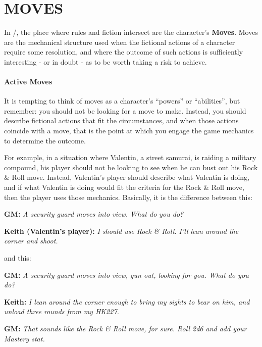 \documentclass[oneside,10pt]{article}
\begin{document}
\section{MOVES}
\label{moves}
\begin{multicols}{2}

In \SW/, the place where rules and fiction intersect are the
character’s \textbf{Moves}. Moves are the mechanical structure used
when the fictional actions of a character require some resolution,
and where the outcome of such actions is sufficiently interesting -
or in doubt - as to be worth taking a risk to achieve.

\paragraph{Active Moves}
It is tempting to think of moves as a character’s ``powers'' or
``abilities'', but remember: you should not be looking for a move to
make. Instead, you should describe fictional actions that fit the
circumstances, and when those actions coincide with a move, that is
the point at which you engage the game mechanics to determine the
outcome.

For example, in a situation where Valentin, a street samurai, is
raiding a military compound, his player should not be looking to see
when he can bust out his Rock \& Roll move. Instead, Valentin’s player
should describe what Valentin is doing, and if what Valentin is doing
would fit the criteria for the Rock \& Roll move, then the player uses
those mechanics. Basically, it is the difference between this:

\begin{dent}

\textbf{GM:} \textit{A security guard moves into
  view. What do you do?}

\textbf{Keith (Valentin’s player):} \textit{I should use Rock \& Roll. I’ll lean
around the corner and shoot.}
\end{dent}

and this:
\begin{dent}

\textbf{GM:} \textit{A security guard moves into view, gun out, looking
for you. What do you do?}

\textbf{Keith:} \textit{I lean around the corner enough to bring my sights
to bear on him, and unload three rounds from my
HK227.}

\textbf{GM:} \textit{That sounds like the Rock \& Roll move, for sure. Roll
2d6 and add your Mastery stat.}
\end{dent}


\end{multicols}
\end{document}
